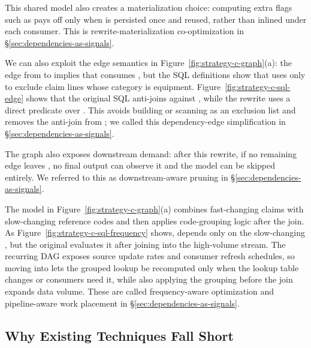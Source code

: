 This shared model also creates a materialization choice: computing extra flags such as  pays off only when  is persisted once and reused, rather than inlined under each consumer. This is rewrite-materialization co-optimization in \S\ref{sec:dependencies-as-signals}.


We can also exploit the edge semantics in Figure~\ref{fig:strategy-c-graph}(a): the edge from  to  implies that  consumes , but the SQL definitions show that  uses  only to exclude claim lines whose category is equipment. 
Figure~\ref{fig:strategy-c-sql-edge} shows that the original  SQL anti-joins against , while the rewrite uses a direct predicate over . This avoids building or scanning  as an exclusion list and removes the anti-join from ;  we called this dependency-edge simplification in \S\ref{sec:dependencies-as-signals}.

The graph also exposes downstream demand: after this rewrite, if no remaining edge leaves , no final output can observe it and the model can be skipped entirely. We referred to this as downstream-aware pruning in \S\ref{sec:dependencies-as-signals}.

The  model in Figure~\ref{fig:strategy-c-graph}(a) combines fast-changing claims with slow-changing reference codes and then applies code-grouping logic after the join. 
As Figure~\ref{fig:strategy-c-sql-frequency} shows,  depends only on the slow-changing , but the original  evaluates it after joining into the high-volume  stream. The recurring DAG exposes source update rates and consumer refresh schedules, so moving  into  lets the grouped lookup be recomputed only when the lookup table changes or consumers need it, while also applying the grouping before the join expands data volume. These are called frequency-aware optimization and pipeline-aware work placement in \S\ref{sec:dependencies-as-signals}.


\subsection{Why Existing Techniques Fall Short}
\label{sec:why-different}



